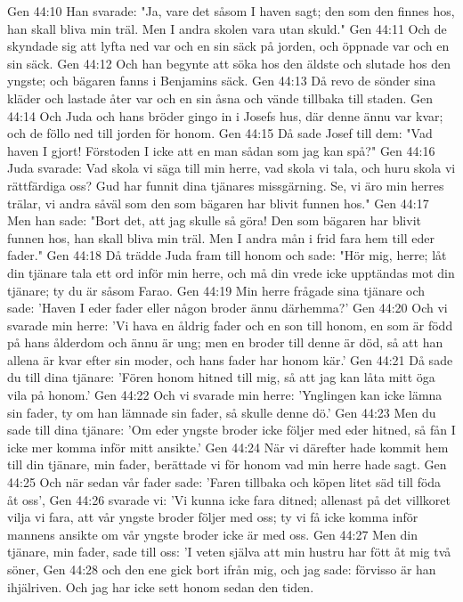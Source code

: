 Gen 44:10  Han svarade: "Ja, vare det såsom I haven sagt; den som den finnes hos, han skall bliva min träl. Men I andra skolen vara utan skuld."
Gen 44:11  Och de skyndade sig att lyfta ned var och en sin säck på jorden, och öppnade var och en sin säck.
Gen 44:12  Och han begynte att söka hos den äldste och slutade hos den yngste; och bägaren fanns i Benjamins säck.
Gen 44:13  Då revo de sönder sina kläder och lastade åter var och en sin åsna och vände tillbaka till staden.
Gen 44:14  Och Juda och hans bröder gingo in i Josefs hus, där denne ännu var kvar; och de föllo ned till jorden för honom.
Gen 44:15  Då sade Josef till dem: "Vad haven I gjort! Förstoden I icke att en man sådan som jag kan spå?"
Gen 44:16  Juda svarade: Vad skola vi säga till min herre, vad skola vi tala, och huru skola vi rättfärdiga oss? Gud har funnit dina tjänares missgärning. Se, vi äro min herres trälar, vi andra såväl som den som bägaren har blivit funnen hos."
Gen 44:17  Men han sade: "Bort det, att jag skulle så göra! Den som bägaren har blivit funnen hos, han skall bliva min träl. Men I andra mån i frid fara hem till eder fader."
Gen 44:18  Då trädde Juda fram till honom och sade: "Hör mig, herre; låt din tjänare tala ett ord inför min herre, och må din vrede icke upptändas mot din tjänare; ty du är såsom Farao.
Gen 44:19  Min herre frågade sina tjänare och sade: 'Haven I eder fader eller någon broder ännu därhemma?'
Gen 44:20  Och vi svarade min herre: 'Vi hava en åldrig fader och en son till honom, en som är född på hans ålderdom och ännu är ung; men en broder till denne är död, så att han allena är kvar efter sin moder, och hans fader har honom kär.'
Gen 44:21  Då sade du till dina tjänare: 'Fören honom hitned till mig, så att jag kan låta mitt öga vila på honom.'
Gen 44:22  Och vi svarade min herre: 'Ynglingen kan icke lämna sin fader, ty om han lämnade sin fader, så skulle denne dö.'
Gen 44:23  Men du sade till dina tjänare: 'Om eder yngste broder icke följer med eder hitned, så fån I icke mer komma inför mitt ansikte.'
Gen 44:24  När vi därefter hade kommit hem till din tjänare, min fader, berättade vi för honom vad min herre hade sagt.
Gen 44:25  Och när sedan vår fader sade: 'Faren tillbaka och köpen litet säd till föda åt oss',
Gen 44:26  svarade vi: 'Vi kunna icke fara ditned; allenast på det villkoret vilja vi fara, att vår yngste broder följer med oss; ty vi få icke komma inför mannens ansikte om vår yngste broder icke är med oss.
Gen 44:27  Men din tjänare, min fader, sade till oss: 'I veten själva att min hustru har fött åt mig två söner,
Gen 44:28  och den ene gick bort ifrån mig, och jag sade: förvisso är han ihjälriven. Och jag har icke sett honom sedan den tiden.
